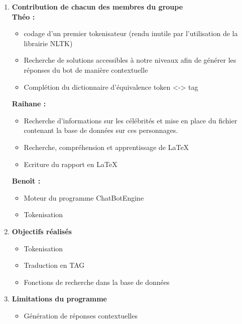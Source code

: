 \documentclass[french,12pt]{article}
\begin{document}
\begin{enumerate}
\bigbreak
\item \textbf{Contribution de chacun des membres du groupe} \\
\textbf{Théo :} \\
\begin{itemize}
\item codage d'un premier tokenisateur (rendu inutile par l'utilisation de la librairie NLTK)
\item Recherche de solutions accessibles à notre niveaux afin de générer les réponses du bot de manière contextuelle
\item Complétion du dictionnaire d'équivalence token <-> tag
\end{itemize}
\bigbreak
\textbf{Raihane :} \\ 
\begin{itemize}
\item Recherche d'informations sur les célébrités et mise en place du fichier contenant la base de données sur ces personnages.
\item Recherche, compréhension et apprentissage de LaTeX 
\item Ecriture du rapport en LaTeX
\end{itemize}
\bigbreak
\textbf{Benoît :}  \\
\begin{itemize}
\item Moteur du programme ChatBotEngine
\item Tokenisation
\end{itemize}
\bigbreak
\item \textbf{Objectifs réalisés } \\
\begin{itemize}
\item Tokenisation
\item Traduction en TAG
\item Fonctions de recherche dans la base de données
\end{itemize}

\bigbreak
\item \textbf{Limitations du programme} \\
\begin{itemize}
\item Génération de réponses contextuelles

\end{itemize}
\end{enumerate}
\end{document}
